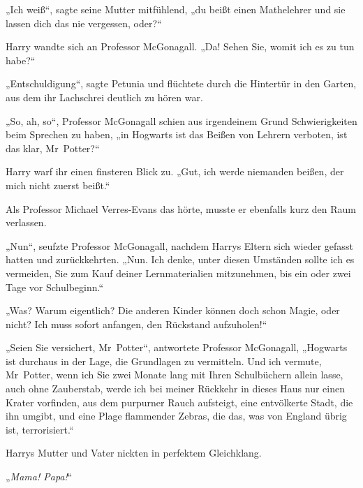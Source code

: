 „Ich weiß“, sagte seine Mutter mitfühlend, „du beißt einen Mathelehrer und sie lassen dich das nie vergessen, oder?“

Harry wandte sich an Professor McGonagall. „Da! Sehen Sie, womit ich es zu tun habe?“

„Entschuldigung“, sagte Petunia und flüchtete durch die Hintertür in den Garten, aus dem ihr Lachschrei deutlich zu hören war.

„So, ah, so“, Professor McGonagall schien aus irgendeinem Grund Schwierigkeiten beim Sprechen zu haben, „in Hogwarts ist das Beißen von Lehrern verboten, ist das klar, Mr~Potter?“

Harry warf ihr einen finsteren Blick zu. „Gut, ich werde niemanden beißen, der mich nicht zuerst beißt.“

Als Professor Michael Verres-Evans das hörte, musste er ebenfalls kurz den Raum verlassen.

„Nun“, seufzte Professor McGonagall, nachdem Harrys Eltern sich wieder gefasst hatten und zurückkehrten. „Nun. Ich denke, unter diesen Umständen sollte ich es vermeiden, Sie zum Kauf deiner Lernmaterialien mitzunehmen, bis ein oder zwei Tage vor Schulbeginn.“

„Was? Warum eigentlich? Die anderen Kinder können doch schon Magie, oder nicht? Ich muss sofort anfangen, den Rückstand aufzuholen!“

„Seien Sie versichert, Mr~Potter“, antwortete Professor McGonagall, „Hogwarts ist durchaus in der Lage, die Grundlagen zu vermitteln. Und ich vermute, Mr~Potter, wenn ich Sie zwei Monate lang mit Ihren Schulbüchern allein lasse, auch ohne Zauberstab, werde ich bei meiner Rückkehr in dieses Haus nur einen Krater vorfinden, aus dem purpurner Rauch aufsteigt, eine entvölkerte Stadt, die ihn umgibt, und eine Plage flammender Zebras, die das, was von England übrig ist, terrorisiert.“

Harrys Mutter und Vater nickten in perfektem Gleichklang.

„\emph{Mama! Papa!}“

